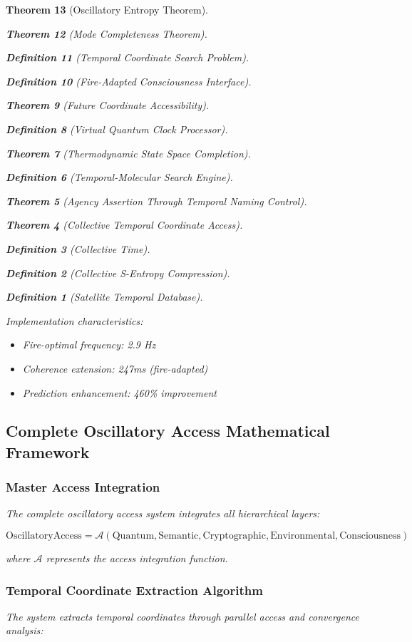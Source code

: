 \documentclass[12pt,a4paper]{article}
\newtheorem{theorem}{Theorem}[section]
\newtheorem{definition}[theorem]{Definition}
\begin{document}
\begin{theorem}[Oscillatory Entropy Theorem]
\begin{theorem}[Mode Completeness Theorem]
\begin{enumerate}
\begin{definition}[Temporal Coordinate Search Problem]
\begin{algorithm}
\begin{definition}[Fire-Adapted Consciousness Interface]
\begin{theorem}[Future Coordinate Accessibility]
\begin{definition}[Virtual Quantum Clock Processor]
\begin{itemize}
\begin{itemize}
\begin{theorem}[Thermodynamic State Space Completion]
\begin{definition}[Temporal-Molecular Search Engine]
\begin{theorem}[Agency Assertion Through Temporal Naming Control]
\begin{remark}
\begin{theorem}[Collective Temporal Coordinate Access]
\begin{definition}[Collective Time]
\begin{definition}[Collective S-Entropy Compression]
\begin{definition}[Satellite Temporal Database]
\begin{algorithm}
\begin{table}[h]
{{Implementation characteristics:
\begin{itemize}
\item Fire-optimal frequency: 2.9 Hz
\item Coherence extension: 247ms (fire-adapted)
\item Prediction enhancement: 460\% improvement
\end{itemize}

\subsection{Complete Oscillatory Access Mathematical Framework}

\subsubsection{Master Access Integration}

The complete oscillatory access system integrates all hierarchical layers:

\begin{equation}
\text{OscillatoryAccess} = \mathcal{A}(\text{Quantum}, \text{Semantic}, \text{Cryptographic}, \text{Environmental}, \text{Consciousness})
\end{equation}

where $\mathcal{A}$ represents the access integration function.

\subsubsection{Temporal Coordinate Extraction Algorithm}

The system extracts temporal coordinates through parallel access and convergence analysis:

}}
\end{table}
\end{algorithm}
\end{definition}
\end{definition}
\end{definition}
\end{theorem}
\end{remark}
\end{theorem}
\end{definition}
\end{theorem}
\end{itemize}
\end{itemize}
\end{definition}
\end{theorem}
\end{definition}
\end{algorithm}
\end{definition}
\end{enumerate}
\end{theorem}
\end{theorem}
\end{document}
